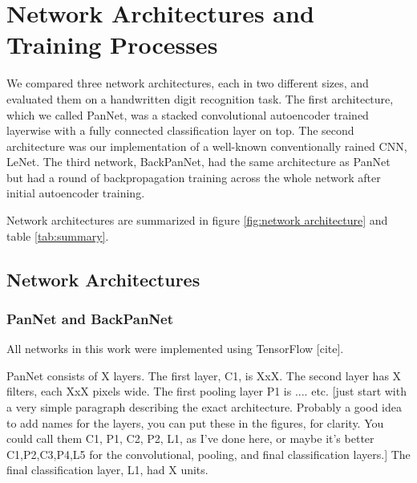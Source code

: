 \chapter{Network Architectures and Training Processes} %

\label{Chapter 3} %

We compared three network architectures, each in two different sizes, and evaluated them on a handwritten digit recognition task. The first architecture, which we called PanNet, was a stacked convolutional autoencoder trained layerwise with a fully connected classification layer on top. The second architecture was our implementation of a well-known conventionally rained CNN, LeNet. The third network, BackPanNet, had the same architecture as PanNet but had a round of backpropagation training across the whole network after initial autoencoder training.

Network architectures are summarized in figure \ref{fig:network architecture} and table \ref{tab:summary}. 



\section{Network Architectures}

\subsection{PanNet and BackPanNet}

All networks in this work were implemented using TensorFlow [cite].

PanNet consists of X layers. The first layer, C1, is XxX. The second layer has X filters, each XxX pixels wide. The first pooling layer P1 is .... etc. [just start with a very simple paragraph describing the exact architecture. Probably a good idea to add names for the layers, you can put these in the figures, for clarity. You could call them C1, P1, C2, P2, L1, as I've done here, or maybe it's better C1,P2,C3,P4,L5 for the convolutional, pooling, and final classification layers.] The final classification layer, L1, had X units.

